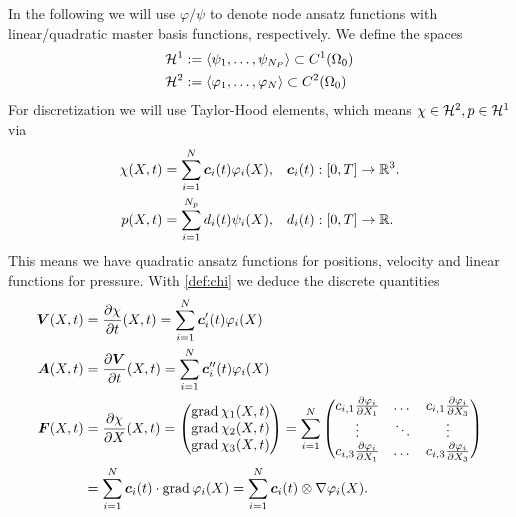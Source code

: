 In the following we will use $\varphi/\psi$ to denote node ansatz functions with linear/quadratic master basis functions, respectively.
We define the spaces
\begin{align*}
	\mathcal{H}^1 &:= \langle \psi_1,\ldots,\psi_{N_P} \rangle \subset C^1(\Omega_0)\\
	\mathcal{H}^2 &:= \langle \varphi_1,\ldots,\varphi_N \rangle \subset C^2(\Omega_0)
\end{align*} 
For discretization we will use Taylor-Hood elements, which means $\chi\in\mathcal{H}^2, p\in\mathcal{H}^1$ via
\begin{align}
	\chi(X,t) &= \sum\limits_{i=1}^{N} \boldsymbol{c}_i(t)\varphi_i(X), && \boldsymbol{c}_i(t):[0,T] \to\mathbb{R}^3.\label{def:chi}\\
	p(X,t) &= \sum\limits_{i=1}^{N_p} d_i(t)\psi_i(X), && d_i(t):[0,T] \to\mathbb{R}.
\end{align}
This means we have quadratic ansatz functions for positions, velocity and linear functions for pressure.
With \eqref{def:chi} we deduce the discrete quantities
\begin{align*}
	\boldsymbol{V}(X,t) &= \frac{\partial \chi}{\partial t}(X,t) = \sum\limits_{i=1}^{N} \boldsymbol{c}_i'(t)\varphi_i(X)\\
	\boldsymbol{A}(X,t) &= \frac{\partial \boldsymbol{V}}{\partial t}(X,t) = \sum\limits_{i=1}^{N} \boldsymbol{c}_i''(t)\varphi_i(X)\\
	\boldsymbol{F}(X,t) &= \frac{\partial \chi}{\partial X}(X,t) = \left(\begin{matrix}\operatorname{grad} \chi_1(X,t)\\ \operatorname{grad} \chi_2(X,t)\\ \operatorname{grad} \chi_3(X,t)\end{matrix}\right)
		   = \sum\limits_{i=1}^{N}\left(\begin{matrix}c_{i,1}\frac{\partial \varphi_i}{\partial X_1} & \dots & c_{i,1}\frac{\partial \varphi_i}{\partial X_3}\\
		   				\vdots & \ddots & \vdots\\
		   				c_{i,3}\frac{\partial \varphi_i}{\partial X_1} & \dots & c_{i,3}\frac{\partial \varphi_i}{\partial X_3}\end{matrix}\right)\\
		   &=\sum\limits_{i=1}^{N} \boldsymbol{c}_i(t)\cdot \operatorname{grad}\varphi_i(X) = \sum\limits_{i=1}^{N} \boldsymbol{c}_i(t)\otimes \nabla\varphi_{i}(X).
\end{align*}

